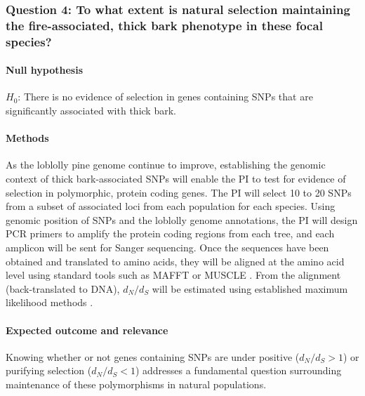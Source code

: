 \subsubsection*{Question 4: To what extent is natural selection maintaining the fire-associated, thick bark phenotype in these focal species?}

\paragraph{Null hypothesis} $H_0$: There is no evidence of selection in genes containing SNPs that are significantly associated 
with thick bark.

\paragraph{Methods} As the loblolly pine genome continue to improve, establishing the genomic context of thick 
bark-associated SNPs will enable the PI to test for evidence of selection in polymorphic, protein coding genes.  The PI will select 
10 to 20 SNPs from a subset of associated loci from each population for each species.   Using genomic position of SNPs and the loblolly 
genome annotations, the PI will design PCR primers to amplify the protein coding regions from each tree, and each amplicon will be sent 
for Sanger sequencing.  Once the sequences have been obtained and translated to amino acids, they will be aligned at the amino acid level 
using standard tools such as MAFFT \citep{Katoh:2005ia} or MUSCLE \citep{Edgar:2004ic}.  From the alignment (back-translated to DNA), 
$d_N/d_S$ will be estimated using established maximum likelihood methods \citep{Yang:2007ki}.

\paragraph{Expected outcome and relevance}  Knowing whether or not genes containing SNPs are under positive ($d_N/d_S > 1$) or 
purifying selection ($d_N/d_S < 1$) addresses a fundamental question surrounding maintenance of these polymorphisms in 
natural populations.  

